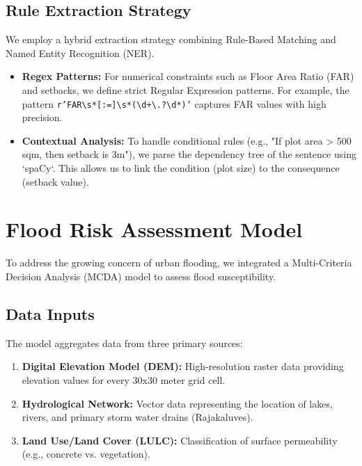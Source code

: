 \documentclass[12pt,a4paper]{report}
\begin{document}
\subsection{Rule Extraction Strategy}
We employ a hybrid extraction strategy combining Rule-Based Matching and Named Entity Recognition (NER).
\begin{itemize}
    \item \textbf{Regex Patterns:} For numerical constraints such as Floor Area Ratio (FAR) and setbacks, we define strict Regular Expression patterns. For example, the pattern \texttt{r'FAR\textbackslash s*[:=]\textbackslash s*(\textbackslash d+\textbackslash.?\textbackslash d*)'} captures FAR values with high precision.
    \item \textbf{Contextual Analysis:} To handle conditional rules (e.g., "If plot area > 500 sqm, then setback is 3m"), we parse the dependency tree of the sentence using `spaCy`. This allows us to link the condition (plot size) to the consequence (setback value).
\end{itemize}

\section{Flood Risk Assessment Model}
To address the growing concern of urban flooding, we integrated a Multi-Criteria Decision Analysis (MCDA) model to assess flood susceptibility.

\subsection{Data Inputs}
The model aggregates data from three primary sources:
\begin{enumerate}
    \item \textbf{Digital Elevation Model (DEM):} High-resolution raster data providing elevation values for every 30x30 meter grid cell.
    \item \textbf{Hydrological Network:} Vector data representing the location of lakes, rivers, and primary storm water drains (Rajakaluves).
    \item \textbf{Land Use/Land Cover (LULC):} Classification of surface permeability (e.g., concrete vs. vegetation).
\end{enumerate}
\end{document}
